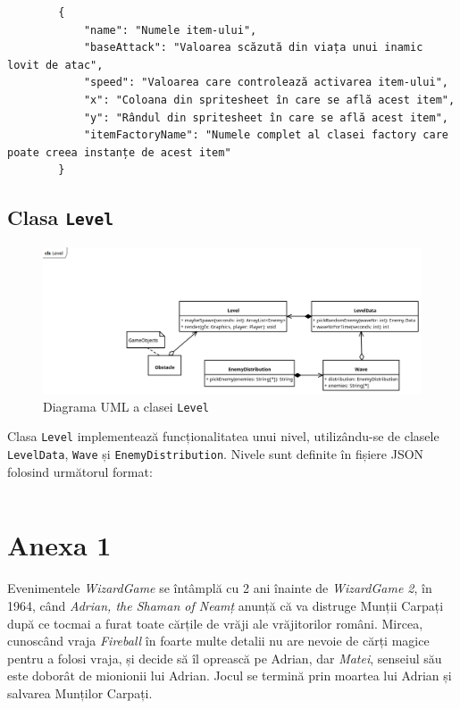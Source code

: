 \documentclass{article}
\begin{document}
    \begin{verbatim}
        {
            "name": "Numele item-ului",
            "baseAttack": "Valoarea scăzută din viața unui inamic lovit de atac",
            "speed": "Valoarea care controlează activarea item-ului",
            "x": "Coloana din spritesheet în care se află acest item",
            "y": "Rândul din spritesheet în care se află acest item",
            "itemFactoryName": "Numele complet al clasei factory care poate creea instanțe de acest item"
        }
    \end{verbatim}

    \subsection{Clasa \texttt{Level}}
    \begin{figure}[H]
        \includegraphics[width=\textwidth]{level-diagram}
        \centering
        \caption{Diagrama UML a clasei \texttt{Level}}
    \end{figure}

    Clasa \texttt{Level} implementează funcționalitatea unui nivel, utilizându-se de clasele
    \texttt{LevelData}, \texttt{Wave} și \texttt{EnemyDistribution}. Nivele sunt definite în fișiere
    JSON folosind următorul format:

    \inputminted[linenos, breaklines]{json}{example-level.json}

    \section*{Anexa 1}
    \label{sec:anexa1}
    Evenimentele \emph{WizardGame} se întâmplă cu 2 ani înainte de \emph{WizardGame 2}, în 1964,
    când \emph{Adrian, the Shaman of Neamț} anunță că va distruge Munții Carpați după ce tocmai
    a furat toate cărțile de vrăji ale vrăjitorilor români. Mircea, cunoscând vraja \emph{Fireball}
    în foarte multe detalii nu are nevoie de cărți magice pentru a folosi vraja, și decide să îl
    oprească pe Adrian, dar \emph{Matei}, senseiul său este doborât de mionionii lui Adrian.
    Jocul se termină prin moartea lui Adrian și salvarea Munților Carpați.
\end{document}

